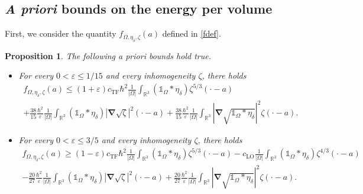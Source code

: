 \documentclass[final,onefignum,onetabnum,reqno]{amsart}
\newtheorem{proposition}[theorem]{Proposition}
\theoremstyle{remark}
\renewcommand{\le}{\leqslant}
\renewcommand{\ge}{\geqslant}
\renewcommand{\epsilon}{\varepsilon}
\newcommand{\RR}{\mathbb{R}}
\newcommand{\TF}{\mathrm{TF}} %
\newcommand{\LO}{\mathrm{LO}} %
\newcommand{\iden}{\mathbb{1}} %
\newcommand{\grad}{\bm{\nabla}} %
\begin{document}
\subsection{\emph{A priori} bounds on the energy per volume} 
First, we consider the quantity $f_{\Omega,\eta_\delta,\zeta}(a)$ defined in \cref{fdef}.

\begin{proposition}\label{basicbdprop}
The following a priori bounds hold true.
\begin{itemize}
\item[(i)] For every $0<\epsilon\le 1/15$ and every inhomogeneity $\zeta$, there holds
\begin{multline*}
f_{\Omega,\eta_\delta,\zeta}(a)\le (1+\epsilon) c_{\TF}\hbar^2  \frac{1}{|\Omega|} \int_{\RR^3} (\iden_{\Omega}*\eta_\delta)\zeta^{5/3}(\cdot-a) \\
+ \frac{38}{15}\frac{\hbar^2}{\epsilon} \frac{1}{|\Omega|} \int_{\RR^3} (\iden_{\Omega}*\eta_\delta)|\grad \sqrt{\zeta}|^2(\cdot-a)+ \frac{38}{15}\frac{\hbar^2}{\epsilon} \frac{1}{|\Omega|} \int_{\RR^3} |\grad \sqrt{\iden_{\Omega}*\eta_\delta}|^2\zeta(\cdot-a) .
\end{multline*}
\item[(ii)] For every $0<\epsilon\le 3/5$ and every inhomogeneity $\zeta$, there holds 
\begin{multline*}
f_{\Omega,\eta_\delta,\zeta}(a)\ge (1-\epsilon) c_{\TF}\hbar^2  \frac{1}{|\Omega|} \int_{\RR^3} (\iden_{\Omega}*\eta_\delta)\zeta^{5/3}(\cdot-a) -c_\LO \frac{1}{|\Omega|}\int_{\RR^3} (\iden_{\Omega}*\eta_\delta)\zeta^{4/3}(\cdot-a) \\
- \frac{20}{27}\frac{\hbar^2}{\epsilon} \frac{1}{|\Omega|} \int_{\RR^3} (\iden_{\Omega}*\eta_\delta)|\grad \sqrt{\zeta}|^2(\cdot-a) + \frac{20}{27}\frac{\hbar^2}{\epsilon} \frac{1}{|\Omega|} \int_{\RR^3} |\grad \sqrt{\iden_{\Omega}*\eta_\delta}|^2\zeta(\cdot-a) .
\end{multline*}
\end{itemize}
\end{proposition}
\end{document}
